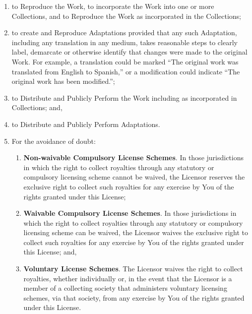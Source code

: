 \begin{enumerate}
\item to Reproduce the Work, to incorporate the Work into
  one or more Collections, and to Reproduce the Work as
  incorporated in the Collections;

\item to create and Reproduce Adaptations provided that any
  such Adaptation, including any translation in any medium,
  takes reasonable steps to clearly label, demarcate or
  otherwise identify that changes were made to the original
  Work. For example, a translation could be marked ``The
  original work was translated from English to Spanish,'' or
  a modification could indicate ``The original work has been
  modified.'';

\item to Distribute and Publicly Perform the Work including
  as incorporated in Collections; and,

\item to Distribute and Publicly Perform Adaptations.

\item
\par
For the avoidance of doubt:

\begin{enumerate}
   \item \textbf{Non-waivable Compulsory License
      Schemes}. In those jurisdictions in which the
      right to collect royalties through any statutory or
      compulsory licensing scheme cannot be waived, the
      Licensor reserves the exclusive right to collect such
      royalties for any exercise by You of the rights
      granted under this License;

   \item \textbf{Waivable Compulsory License
      Schemes}. In those jurisdictions in which the
      right to collect royalties through any statutory or
      compulsory licensing scheme can be waived, the
      Licensor waives the exclusive right to collect such
      royalties for any exercise by You of the rights
      granted under this License; and,

   \item \textbf{Voluntary License Schemes}. The
      Licensor waives the right to collect royalties,
      whether individually or, in the event that the
      Licensor is a member of a collecting society that
      administers voluntary licensing schemes, via that
      society, from any exercise by You of the rights
      granted under this License.
\end{enumerate}
\end{enumerate}


